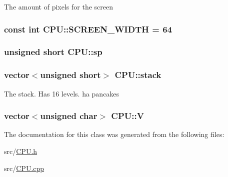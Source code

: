 The amount of pixels for the screen \hypertarget{classCPU_a8feada83f7887e1a418c4dd308fbd4a9}{
\subsubsection[{S\-C\-R\-E\-E\-N\-\_\-\-W\-I\-D\-T\-H}]{\setlength{\rightskip}{0pt plus 5cm}const int C\-P\-U\-::\-S\-C\-R\-E\-E\-N\-\_\-\-W\-I\-D\-T\-H = 64\hspace{0.3cm}{\ttfamily [static]}}}\label{classCPU_a8feada83f7887e1a418c4dd308fbd4a9}
\hypertarget{classCPU_a4d0854788d689d0f4ee604f3001b1732}{
\subsubsection[{sp}]{\setlength{\rightskip}{0pt plus 5cm}unsigned short C\-P\-U\-::sp\hspace{0.3cm}{\ttfamily [private]}}}\label{classCPU_a4d0854788d689d0f4ee604f3001b1732}
\hypertarget{classCPU_a89db51ac963d4badd4c9c7a701f1edea}{
\subsubsection[{stack}]{\setlength{\rightskip}{0pt plus 5cm}vector$<$unsigned short$>$ C\-P\-U\-::stack\hspace{0.3cm}{\ttfamily [private]}}}\label{classCPU_a89db51ac963d4badd4c9c7a701f1edea}
The stack. Has 16 levels. ha pancakes \hypertarget{classCPU_a2fc154eb8eb17dd75c897fc69c48ab31}{
\subsubsection[{V}]{\setlength{\rightskip}{0pt plus 5cm}vector$<$unsigned char$>$ C\-P\-U\-::\-V\hspace{0.3cm}{\ttfamily [private]}}}\label{classCPU_a2fc154eb8eb17dd75c897fc69c48ab31}


The documentation for this class was generated from the following files\-:\begin{DoxyCompactItemize}
\item 
src/\hyperlink{CPU_8h}{C\-P\-U.\-h}\item 
src/\hyperlink{CPU_8cpp}{C\-P\-U.\-cpp}\end{DoxyCompactItemize}
